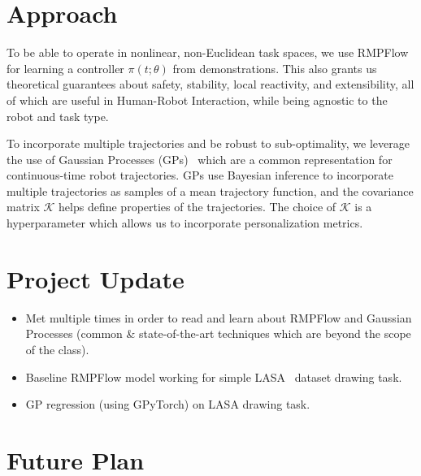 \documentclass{article}
\begin{document}
\section{Approach}

To be able to operate in nonlinear, non-Euclidean task spaces, we use RMPFlow for learning a controller $\pi(t; \theta)$ from demonstrations. This also grants us theoretical guarantees about safety, stability, local reactivity, and extensibility, all of which are useful in Human-Robot Interaction, while being agnostic to the robot and task type.

To incorporate multiple trajectories and be robust to sub-optimality, we leverage the use of Gaussian Processes (GPs)~\cite{Mukadam18ijrr,Bhardwaj20icra,vanWaveren22manuscript} which are a common representation for continuous-time robot trajectories. GPs use Bayesian inference to incorporate multiple trajectories as samples of a mean trajectory function, and the covariance matrix $\mathcal{K}$ helps define properties of the trajectories. The choice of $\mathcal{K}$ is a hyperparameter which allows us to incorporate personalization metrics.



\section{Project Update}


\begin{itemize}
    \item Met multiple times in order to read and learn about RMPFlow and Gaussian Processes (common \& state-of-the-art techniques which are beyond the scope of the class).
    \item Baseline RMPFlow model working for simple LASA~\cite{Khansari-Zadeh11tro} dataset drawing task.
    \item GP regression (using GPyTorch) on LASA drawing task.
\end{itemize}


\section{Future Plan}
\end{document}
